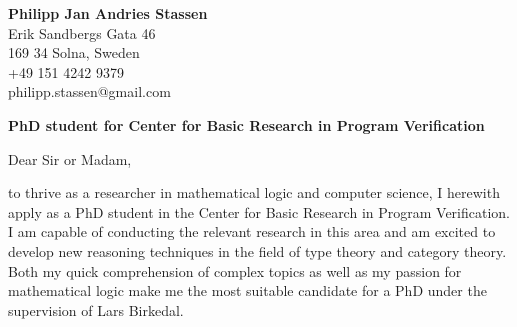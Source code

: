 \documentclass[10pt]{letter} %
\begin{document}
\begin{letter}{}%
\begin{center}
	\textbf{Philipp Jan Andries Stassen} \\ %
Erik Sandbergs Gata 46 \\ 169 34 Solna, Sweden \\ +49 151 4242 9379 \\ philipp.stassen@gmail.com %
\end{center} 

\vspace{1.5em}
\begin{center} \large\bf PhD student for Center for Basic Research in Program Verification
\end{center}
\bigskip


Dear Sir or Madam,

\smallskip

to thrive as a researcher in mathematical logic and computer science, I herewith apply as a PhD student in the Center for Basic Research in Program Verification. 
I am capable of conducting the relevant research in this area and am excited to develop new reasoning techniques in the field of type theory and category theory.
Both my quick comprehension of complex topics as well as my passion for mathematical logic make me the most suitable candidate for a PhD under the supervision of Lars Birkedal.



\end{letter}
\end{document}
